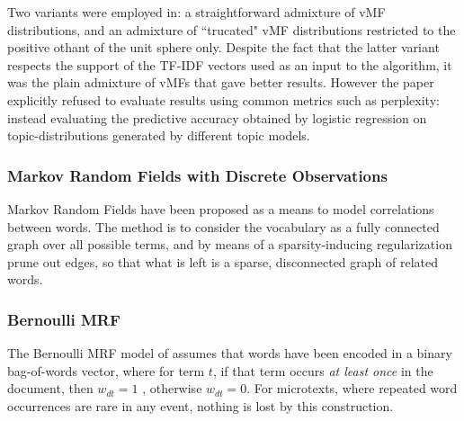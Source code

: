 Two variants were employed in\cite{Reisinger2010}: a straightforward admixture of vMF distributions, and an admixture of ``trucated" vMF distributions restricted to the positive othant of the unit sphere only. Despite the fact that the latter variant respects the support of the TF-IDF vectors used as an input to the algorithm, it was the plain admixture of vMFs that gave better results. However the paper explicitly refused to evaluate results using common metrics such as perplexity: instead evaluating the predictive accuracy obtained by logistic regression on topic-distributions generated by different topic models.

\subsubsection*{Markov Random Fields with Discrete Observations}
Markov Random Fields have been proposed as a means to  model correlations between words. The method is to consider the vocabulary as a fully connected graph over all possible terms, and by means of a sparsity-inducing regularization prune out edges, so that what is left is a sparse, disconnected graph of related words.

%
%

\subsubsection*{Bernoulli MRF}
The Bernoulli MRF model of \cite{Nallapati2007} assumes that words have been encoded in a binary bag-of-words vector, where for term $t$, if that term occurs \emph{at least once} in the document, then $w_{dt} = 1$ , otherwise $w_{dt} = 0$. For microtexts, where repeated word occurrences are rare in any event, nothing is lost by this construction.

